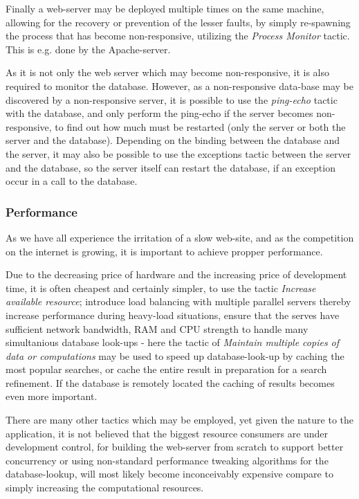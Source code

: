 Finally a web-server may be deployed multiple times on the same machine, allowing for the recovery or prevention of the lesser faults, by simply re-spawning the process that has become non-responsive, utilizing the \emph{Process Monitor} tactic. This is e.g. done by the Apache-server.

As it is not only the web server which may become non-responsive, it is also required to monitor the database. However, as a non-responsive data-base may be discovered by a non-responsive server, it is possible to use the \emph{ping-echo} tactic with the database, and only perform the ping-echo if the server becomes non-responsive, to find out how much must be restarted (only the server or both the server and the database). 
Depending on the binding between the database and the server, it may also be possible to use the exceptions tactic between the server and the database, so the server itself can restart the database, if an exception occur in a call to the database. 

\subsubsection{Performance}

As we have all experience the irritation of a slow web-site, and as the competition on the internet is growing, it is important to achieve propper performance.

Due to the decreasing price of hardware and the increasing price of development time, it is often cheapest and certainly simpler, to use the tactic \emph{Increase available resource}; introduce load balancing with multiple parallel servers thereby increase performance during heavy-load situations, ensure that the serves have sufficient network bandwidth, RAM and CPU strength to handle many simultanious database look-ups - here the tactic of \emph{Maintain multiple copies of data or computations} may be used to speed up database-look-up by caching the most popular searches, or cache the entire result in preparation for a search refinement. If the database is remotely located the caching of results becomes even more important.

There are many other tactics which may be employed, yet given the nature to the application, it is not believed that the biggest resource consumers are under development control, for building the web-server from scratch to support better concurrency or using non-standard performance tweaking algorithms for the database-lookup, will most likely become inconceivably expensive compare to simply increasing the computational resources.

